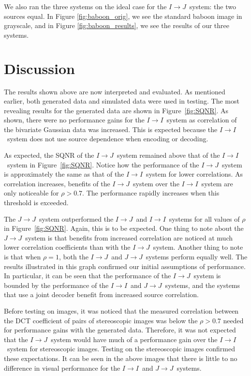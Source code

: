 \documentclass[10pt,twoside,titlepage]{article}
\newcommand{\sysII}{\mbox{$I \rightarrow I$}}
\newcommand{\sysIJ}{\mbox{$I \rightarrow J$}}
\newcommand{\sysJJ}{\mbox{$J \rightarrow J$}}
\begin{document}
We also ran the three systems on the ideal case for the \sysIJ\ system: the two sources equal. In Figure \ref{fig:baboon_orig}, we see the standard baboon image in grayscale, and in Figure \ref{fig:baboon_results}, we see the results of our three systems.

\clearpage
\section{Discussion}
The results shown above are now interpreted and evaluated. As mentioned earlier, both generated data and simulated data were used in testing. The most revealing results for the generated data are shown in Figure~\ref{fig:SQNR}. As shown, there were no performance gains for the \sysII\ system as correlation of the bivariate Gaussian data was increased. This is expected because the \sysII\ system does not use source dependence when encoding or decoding.

As expected, the SQNR of the \sysIJ\ system remained above that of the \sysII\ system in Figure~\ref{fig:SQNR}. Notice how the performance of the \sysIJ\ system is approximately the same as that of the \sysII\ system for lower correlations. As correlation increases, benefits of the \sysIJ\ system over the \sysII\ system are only noticeable for $\rho > 0.7$. The performance rapidly increases when this threshold is exceeded.

The \sysJJ\ system outperformed the \sysIJ\ and \sysII\ systems for all values of $\rho$ in Figure~\ref{fig:SQNR}. Again, this is to be expected. One thing to note about the \sysJJ\ system is that benefits from increased correlation are noticed at much lower correlation coefficients than with the \sysIJ\ system. Another thing to note is that when $\rho = 1$, both the \sysIJ\ and \sysJJ\ systems perform equally well. The results illustrated in this graph confirmed our initial assumptions of performance. In particular, it can be seen that the performance of the \sysIJ\ system is bounded by the performance of the \sysII\ and \sysJJ\ systems, and the systems that use a joint decoder benefit from increased source correlation.

Before testing on images, it was noticed that the measured correlation between the DCT coefficient of pairs of stereoscopic images was below the $\rho > 0.7$ needed for performance gains with the generated data. Therefore, it was not expected that the \sysIJ\ system would have much of a performance gain over the \sysII\ system for stereoscopic images. Testing on the stereoscopic images confirmed these expectations. It can be seen in the above images that there is little to no difference in visual performance for the \sysII\ and \sysJJ\ systems.
\end{document}
